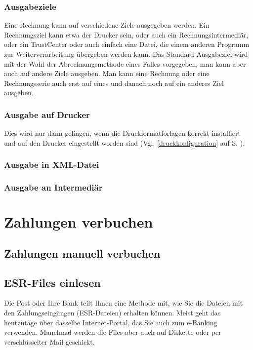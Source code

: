 \documentclass[a4paper]{scrartcl}
\begin{document}
\subsubsection{Ausgabeziele}
Eine Rechnung kann auf verschiedene Ziele ausgegeben werden. Ein Rechnungsziel kann etwa der Drucker sein, oder auch ein Rechnungsintermediär, oder ein TrustCenter oder auch einfach eine Datei, die einem anderen Programm zur Weiterverarbeitung übergeben werden kann. Das Standard-Ausgabeziel wird mit der Wahl der Abrechnungsmethode eines Falles vorgegeben, man kann aber auch auf andere Ziele ausgeben. Man kann eine Rechnung oder eine Rechnungsserie auch erst auf eines und danach noch auf ein anderes Ziel ausgeben.

\subsubsection{Ausgabe auf Drucker}
Dies wird nur dann gelingen, wenn die Druckformatforlagen korrekt installiert und auf den Drucker eingestellt worden sind (Vgl. \ref{druckkonfiguration} auf S. \pageref{druckkonfiguration}).

\subsubsection{Ausgabe in XML-Datei}

\subsubsection{Ausgabe an Intermediär}

\section{Zahlungen verbuchen}

\subsection{Zahlungen manuell verbuchen}

\subsection{ESR-Files einlesen}
Die Post oder Ihre Bank teilt Ihnen eine Methode mit, wie Sie die Dateien mit den Zahlungseingängen (ESR-Dateien) erhalten können. Meist geht das heutzutage über dasselbe Internet-Portal, das Sie auch zum e-Banking verwenden. Manchmal werden die Files aber auch auf Diskette oder per verschlüsselter Mail geschickt.
\end{document}
